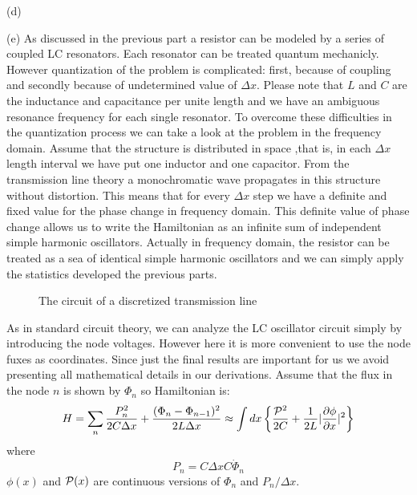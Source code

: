 \begin{homeworkProblem}
\begin{homeworkSection}{(d)}
\end{homeworkSection}
\begin{homeworkSection}{(e)}
As discussed in the previous part a resistor can be modeled by a series of coupled LC resonators. Each resonator can be treated quantum mechanicly. However quantization of the problem is complicated: first, because of coupling and secondly because of undetermined value of $\Delta x$. Please note that $L$ and $C$ are the inductance and capacitance per unite length and we have an ambiguous resonance frequency for each single resonator. To overcome these difficulties in the quantization process we can take a look at the problem in the frequency domain.  Assume that the structure is distributed in space ,that is, in each $\Delta x$ length interval we have put one inductor and one capacitor. From the transmission line theory a monochromatic wave propagates in this structure without distortion. This means that for every $\Delta x$ step we have a definite and fixed value for the phase change in frequency domain. This definite value of phase change allows us to write the Hamiltonian as an infinite sum of independent simple harmonic oscillators. Actually in frequency domain, the resistor can be treated as a sea of identical simple harmonic oscillators and we can simply apply the statistics developed the previous parts.    
\begin{figure}[!h]
\centering

\caption{The circuit of a discretized transmission line}
\end{figure}
As in standard circuit theory, we can analyze the LC oscillator circuit simply by introducing the node voltages. However here it is more convenient to use the node fuxes as coordinates. Since just the final results are important for us we avoid  presenting all mathematical details in our derivations. Assume that the flux in the node $n$ is shown by $\Phi_n$ so Hamiltonian is:
\begin{equation}
H=\sum_n\frac{P_n^2}{2C\Delta x}+\frac{(\Phi_n-\Phi_{n-1})^2}{2L \Delta x }\approx\int dx\left\{ \frac{\mathcal{P}^2}{2C}+\frac{1}{2L}\lvert\dfrac{\partial {\phi}}{\partial x}\rvert^2\right\}
\end{equation}
where
\begin{equation*}
P_n=C\Delta x C\dot{\Phi}_n
\end{equation*}
$\phi(x)$ and $\mathcal{P}(x)$ are continuous versions of $\Phi_n$ and $P_n/\Delta x$. 


\end{homeworkSection}
\end{homeworkProblem}
